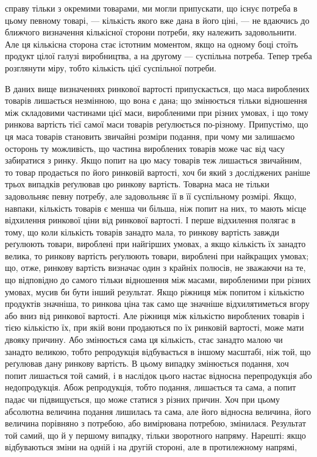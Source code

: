 \parcont{}  %
справу тільки з окремими товарами, ми могли припускати, що
існує потреба в цьому певному товарі, — кількість якого вже
дана в його ціні, — не вдаючись до ближчого визначення кількісної сторони потреби, яку належить
задовольнити. Але ця
кількісна сторона стає істотним моментом, якщо на одному боці
стоїть продукт цілої галузі виробництва, а на другому — суспільна потреба. Тепер треба розглянути
міру, тобто кількість цієї суспільної потреби.

В даних вище визначеннях ринкової вартості припускається,
що маса вироблених товарів лишається незмінною, що вона
є дана; що змінюється тільки відношення між складовими частинами цієї маси, виробленими при різних
умовах, і що тому
ринкова вартість тієї самої маси товарів реґулюється по-різному.
Припустімо, що ця маса товарів становить звичайні розміри
подання, при чому ми залишаємо осторонь ту можливість, що
частина вироблених товарів може час від часу забиратися
з ринку. Якщо попит на цю масу товарів теж лишається звичайним, то товар продається по його ринковій
вартості, хоч би
який з досліджених раніше трьох випадків реґулював цю ринкову вартість. Товарна маса не тільки
задовольняє певну потребу, але задовольняє її в її суспільному розмірі. Якщо, навпаки, кількість
товарів є менша чи більша, ніж попит на них,
то мають місце відхилення ринкової ціни від ринкової вартості.
І перше відхилення полягає в тому, що коли кількість товарів
занадто мала, то ринкову вартість завжди реґулюють товари,
вироблені при найгірших умовах, а якщо кількість їх занадто
велика, то ринкову вартість реґулюють товари, вироблені при
найкращих умовах; що, отже, ринкову вартість визначає один
з крайніх полюсів, не зважаючи на те, що відповідно до самого
тільки відношення між масами, виробленими при різних умовах,
мусив би бути інший результат. Якщо ріжниця між попитом
і кількістю продуктів значніша, то ринкова ціна так само ще
значніше відхилятиметься вгору або вниз від ринкової вартості.
Але ріжниця між кількістю вироблених товарів і тією кількістю
їх, при якій вони продаються по їх ринковій вартості, може
мати двояку причину. Або змінюється сама ця кількість, стає
занадто малою чи занадто великою, тобто репродукція відбувається в іншому масштабі, ніж той, що
реґулював дану
ринкову вартість. В цьому випадку змінюється подання, хоч
попит лишається той самий, і в наслідок цього настає відносна
перепродукція або недопродукція. Абож репродукція, тобто
подання, лишається та сама, а попит падає чи підвищується,
що може статися з різних причин. Хоч при цьому абсолютна
величина подання лишилась та сама, але його відносна величина,
його величина порівняно з потребою, або вимірювана потребою,
змінилася. Результат той самий, що й у першому випадку,
тільки зворотного напряму. Нарешті: якщо відбуваються зміни
на одній і на другій стороні, але в протилежному напрямі,
\parbreak{}  %
